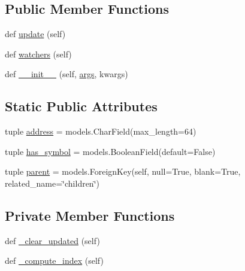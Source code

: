\subsection*{Public Member Functions}
\begin{DoxyCompactItemize}
\item 
def \hyperlink{classmemoryoracle_1_1models_1_1Memory_a71d4a141abc3358afdf1a1325bfd4253}{update} (self)
\item 
def \hyperlink{classmemoryoracle_1_1models_1_1Memory_a03b88e9e9fd70efaaff14de07545d434}{watchers} (self)
\item 
def \hyperlink{classmemoryoracle_1_1models_1_1Memory_aed3af349dd80317ae9cca4b4e9cb7c26}{\+\_\+\+\_\+init\+\_\+\+\_\+} (self, \hyperlink{classmemoryoracle_1_1models_1_1Typed_a81616ab75a5a3b89f9707d0342033614}{args}, kwargs)
\end{DoxyCompactItemize}
\subsection*{Static Public Attributes}
\begin{DoxyCompactItemize}
\item 
tuple \hyperlink{classmemoryoracle_1_1models_1_1Memory_a0d6f1f526a6598c386604e83d37c7223}{address} = models.\+Char\+Field(max\+\_\+length=64)
\item 
tuple \hyperlink{classmemoryoracle_1_1models_1_1Memory_a20fbaa8285673be9bf3237c7b139ff28}{has\+\_\+symbol} = models.\+Boolean\+Field(default=False)
\item 
tuple \hyperlink{classmemoryoracle_1_1models_1_1Memory_a1b2b143c63aea58df9c28c7016425f24}{parent} = models.\+Foreign\+Key(\textquotesingle{}self\textquotesingle{}, null=True, blank=True, related\+\_\+name=\char`\"{}children\char`\"{})
\end{DoxyCompactItemize}
\subsection*{Private Member Functions}
\begin{DoxyCompactItemize}
\item 
def \hyperlink{classmemoryoracle_1_1models_1_1Memory_a253756ba0ddd58fc05a9463c0a181185}{\+\_\+clear\+\_\+updated} (self)
\item 
def \hyperlink{classmemoryoracle_1_1models_1_1Memory_a71e772c88d2638ee6bff1f0615852cff}{\+\_\+compute\+\_\+index} (self)
\end{DoxyCompactItemize}
